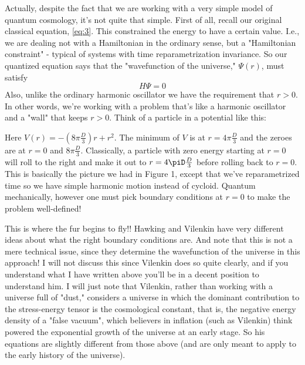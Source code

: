 Actually, despite the fact that we are working with a very simple model of quantum cosmology, it's not quite that simple. First of all, recall our original classical equation, \eqref{eq:3}. This constrained the energy to have a certain value. I.e., we are dealing not with a Hamiltonian in the ordinary sense, but a "Hamiltonian constraint" - typical of systems with time reparametrization invariance. So our quantized equation says that the "wavefunction of the universe," $\Psi(r)$, must satisfy
\[H\Psi = 0\]
Also, unlike the ordinary harmonic oscillator we have the requirement that $r > 0$. In other words, we're working with a problem that's like a harmonic oscillator and a "wall" that keeps $r > 0$. Think of a particle in a potential like this:
\begin{center}
\end{center}

Here $V(r) = - (8\pi \frac{D}{3})r + r^2$. The minimum of $V$ is at $r = 4\pi \frac{D}{3}$ and the zeroes are at $r = 0$ and $8\pi \frac{D}{3}$. Classically, a particle with zero energy starting at $r = 0$ will roll to the right and make it out to $r = 4\piD\frac{D}{3}$ before rolling back to $r = 0$. This is basically the picture we had in Figure 1, except that we've reparametrized time so we have simple harmonic motion instead of cycloid.
Quantum mechanically, however one must pick boundary conditions at $r = 0$ to make the problem well-defined!

This is where the fur begins to fly!! Hawking and Vilenkin have very different ideas about what the right boundary conditions are. And note that this is not a mere technical issue, since they determine the wavefunction of the universe in this approach! I will not discuss this since Vilenkin does so quite clearly, and if you understand what I have written above you'll be in a decent position to understand him. I will just note that Vilenkin, rather than working with a universe full of "dust," considers a universe in which the dominant contribution to the stress-energy tensor is the cosmological constant, that is, the negative energy density of a "false vacuum", which believers in inflation (such as Vilenkin) think powered the exponential growth of the universe at an early stage. So his equations are slightly different from those above (and are only meant to apply to the early history of the universe).

